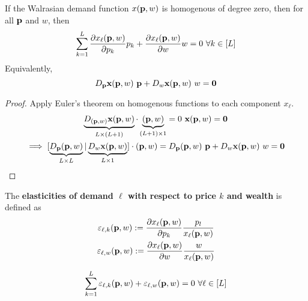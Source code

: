 \documentclass{article}
\begin{document}
 			\begin{proposition}
 				If the Walrasian demand function $x(\textbf{p}, w)$ is homogenous of degree zero, then for all $\textbf{p}$ and $w$, then
 				\begin{equation}
 					\sum_{k=1}^L \frac{\partial{x_\ell(\textbf{p}, w)}}{\partial{p_k}} p_k + \frac{\partial{x_\ell(\textbf{p}, w)}}{\partial{w}} w = 0\ \forall k \in [L]
 				\end{equation}
 				Equivalently,
 				\begin{equation}
 					D_{\textbf{p}} \textbf{x} (\textbf{p}, w)\ \textbf{p} + D_w \textbf{x}(\textbf{p}, w)\ w = \textbf{0}
 				\end{equation}
 				\begin{proof}
 					Apply Euler's theorem on homogenous functions to each component $x_\ell$.
 					\begin{gather}
 						\underbrace{D_{(\textbf{p}, w)} \textbf{x}(\textbf{p}, w)}_{L \times (L+1)} \cdot \underbrace{(\textbf{p}, w)}_{(L+1) \times 1} = 0\ \textbf{x}(\textbf{p}, w) = \textbf{0} \\
 						\implies [\underbrace{D_{\textbf{p}} (\textbf{p}, w)}_{L \times L} | \underbrace{D_w \textbf{x}(\textbf{p}, w)}_{L \times 1}] \cdot (\textbf{p}, w) = D_{\textbf{p}} (\textbf{p}, w)\ \textbf{p} + D_w \textbf{x}(\textbf{p}, w)\ w = \textbf{0}
 					\end{gather}
 				\end{proof}
 			\end{proposition}
 			
 			\begin{definition}
 				The \textbf{elasticities of demand $\ell$ with respect to price $k$ and wealth} is defined as 
 				\begin{gather}
 					\varepsilon_{\ell, k} (\textbf{p}, w) := \frac{\partial{x_\ell (\textbf{p}, w)}}{\partial{p_k}} \frac{p_l}{x_\ell (\textbf{p}, w)}\\
 					\varepsilon_{\ell, w} (\textbf{p}, w) := \frac{\partial{x_\ell (\textbf{p}, w)}}{\partial{w}} \frac{w}{x_\ell (\textbf{p}, w)}
 				\end{gather}
 			\end{definition}
 			
  			\begin{corollary}
 				\begin{equation}
 					\sum_{k=1}^L \varepsilon_{\ell, k}(\textbf{p}, w) + \varepsilon_{\ell, w}(\textbf{p}, w) = 0\ \forall \ell \in [L]
 				\end{equation}
 			\end{corollary}
 			
\end{document}
